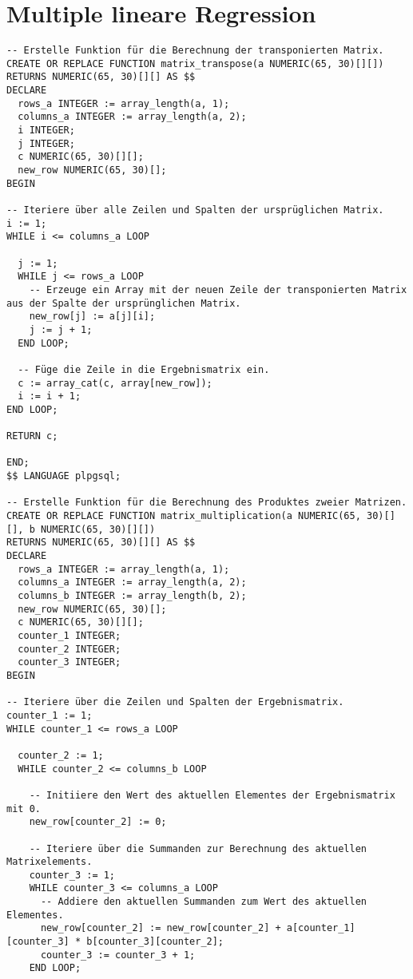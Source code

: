 \section{Multiple lineare Regression}
\label{appendix:E:2}

\begin{verbatim}
-- Erstelle Funktion für die Berechnung der transponierten Matrix.
CREATE OR REPLACE FUNCTION matrix_transpose(a NUMERIC(65, 30)[][])
RETURNS NUMERIC(65, 30)[][] AS $$
DECLARE
  rows_a INTEGER := array_length(a, 1);
  columns_a INTEGER := array_length(a, 2);
  i INTEGER;
  j INTEGER;
  c NUMERIC(65, 30)[][];
  new_row NUMERIC(65, 30)[];
BEGIN

-- Iteriere über alle Zeilen und Spalten der ursprüglichen Matrix.
i := 1;
WHILE i <= columns_a LOOP

  j := 1;
  WHILE j <= rows_a LOOP
    -- Erzeuge ein Array mit der neuen Zeile der transponierten Matrix aus der Spalte der ursprünglichen Matrix.
    new_row[j] := a[j][i];
    j := j + 1;
  END LOOP;

  -- Füge die Zeile in die Ergebnismatrix ein.
  c := array_cat(c, array[new_row]);
  i := i + 1;
END LOOP;

RETURN c;

END;
$$ LANGUAGE plpgsql;

-- Erstelle Funktion für die Berechnung des Produktes zweier Matrizen.
CREATE OR REPLACE FUNCTION matrix_multiplication(a NUMERIC(65, 30)[][], b NUMERIC(65, 30)[][])
RETURNS NUMERIC(65, 30)[][] AS $$
DECLARE
  rows_a INTEGER := array_length(a, 1);
  columns_a INTEGER := array_length(a, 2);
  columns_b INTEGER := array_length(b, 2);
  new_row NUMERIC(65, 30)[];
  c NUMERIC(65, 30)[][];
  counter_1 INTEGER;
  counter_2 INTEGER;
  counter_3 INTEGER;
BEGIN

-- Iteriere über die Zeilen und Spalten der Ergebnismatrix.
counter_1 := 1;
WHILE counter_1 <= rows_a LOOP

  counter_2 := 1;
  WHILE counter_2 <= columns_b LOOP

    -- Initiiere den Wert des aktuellen Elementes der Ergebnismatrix mit 0.
    new_row[counter_2] := 0;

    -- Iteriere über die Summanden zur Berechnung des aktuellen Matrixelements.
    counter_3 := 1;
    WHILE counter_3 <= columns_a LOOP
      -- Addiere den aktuellen Summanden zum Wert des aktuellen Elementes.
      new_row[counter_2] := new_row[counter_2] + a[counter_1][counter_3] * b[counter_3][counter_2];
      counter_3 := counter_3 + 1;
    END LOOP;


\end{verbatim}
